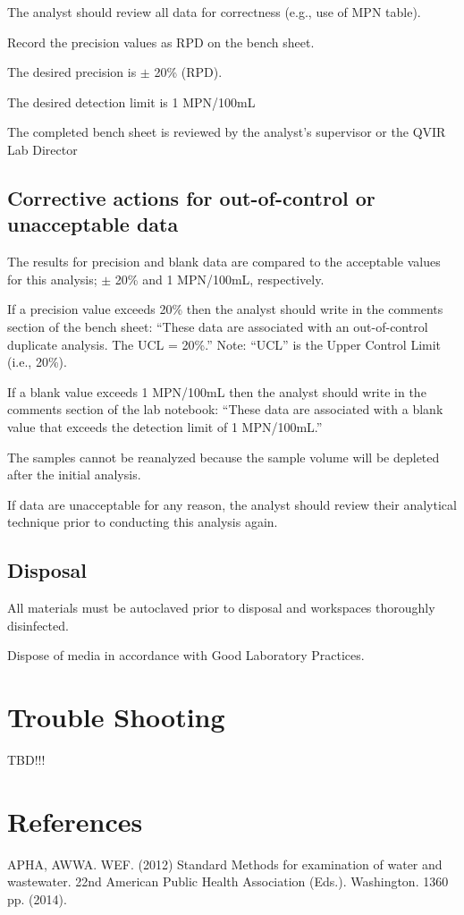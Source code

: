 \documentclass[12pt]{../SOP4_alpha}\usepackage[]{graphicx}\usepackage[]{xcolor}
\begin{document}
\NP The analyst should review all data for correctness (e.g., use of MPN table).


\NP Record the precision values as RPD on the bench sheet.

\NP The desired precision is $\pm$ 20\% (RPD).

\NP The desired detection limit is 1 MPN/100mL

\NP The completed bench sheet is reviewed by the analyst's supervisor or the
QVIR Lab Director 


\subsection{Corrective actions for out-of-control or unacceptable data}

\NP The results for precision and blank data are compared to the
acceptable values for this analysis; $\pm$ 20\% and 1 MPN/100mL,
respectively.

\NP If a precision value exceeds 20\% then the analyst should write in the
comments section of the bench sheet: “These data are associated
with an out-of-control duplicate analysis. The UCL = 20\%.” Note:
``UCL'' is the Upper Control Limit (i.e., 20\%).

\NP If a blank value exceeds 1 MPN/100mL then the analyst should write
in the comments section of the lab notebook: ``These data are
associated with a blank value that exceeds the detection limit of 1
MPN/100mL.''

\NP The samples cannot be reanalyzed because the sample volume will be
depleted after the initial analysis.

\NP  If data are unacceptable for any reason, the analyst should review
their analytical technique prior to conducting this analysis again. 

\subsection{Disposal}


\NP All materials must be autoclaved prior to disposal and workspaces
thoroughly disinfected.

\NP Dispose of media in accordance with Good Laboratory Practices.

\section{Trouble Shooting}

TBD!!! 


\section{References}

\NP APHA, AWWA. WEF. (2012) Standard Methods for examination of water and wastewater. 22nd American Public Health Association (Eds.). Washington. 1360 pp. (2014).

\appendix



\end{document}

